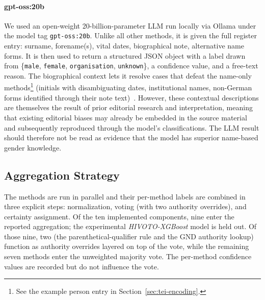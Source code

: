 \documentclass{eceasst}
\begin{document}
\paragraph{gpt-oss:20b} We used an open-weight 20-billion-parameter LLM run locally via Ollama under the model tag \texttt{gpt-oss:20b}. Unlike all other methods, it is given the full register entry: surname, forename(s), vital dates, biographical note, alternative name forms. It is then used to return a structured JSON object with a label drawn from \{\texttt{male}, \texttt{female}, \texttt{organisation}, \texttt{unknown}\}, a confidence value, and a free-text reason. The biographical context lets it resolve cases that defeat the name-only methods\footnote{See the example person entry in Section~\ref{sec:tei-encoding}.} (initials with disambiguating dates, institutional names, non-German forms identified through their note text)~\cite{openai_gpt-oss-120b_2025}. However, these contextual descriptions are themselves the result of prior editorial research and interpretation, meaning that existing editorial biases may already be embedded in the source material and subsequently reproduced through the model’s classifications. The LLM result should therefore not be read as evidence that the model has superior name-based gender knowledge.


\subsection{Aggregation Strategy}
\label{aggregation}

The methods are run in parallel and their per-method labels are combined in three explicit steps: normalization, voting (with two authority overrides), and certainty assignment. Of the ten implemented components, nine enter the reported aggregation; the experimental \textit{HIVOTO-XGBoost} model is held out. Of those nine, two (the parenthetical-qualifier rule and the GND authority lookup) function as authority overrides layered on top of the vote, while the remaining seven methods enter the unweighted majority vote. The per-method confidence values are recorded but do not influence the vote.
\end{document}
